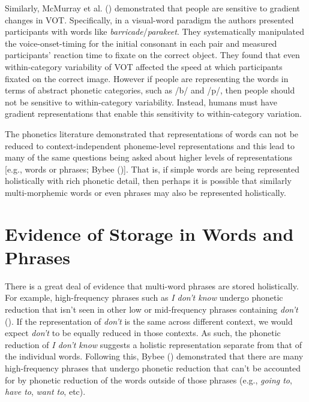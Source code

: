 \documentclass[
  12pt,
  letterpaper,
]{scrreprt}
\begin{document}
Similarly, McMurray et al.
() demonstrated
that people are sensitive to gradient changes in VOT. Specifically, in a
visual-word paradigm the authors presented participants with words like
\emph{barricade}/\emph{parakeet}. They systematically manipulated the
voice-onset-timing for the initial consonant in each pair and measured
participants' reaction time to fixate on the correct object. They found
that even within-category variability of VOT affected the speed at which
participants fixated on the correct image. However if people are
representing the words in terms of abstract phonetic categories, such as
/b/ and /p/, then people should not be sensitive to within-category
variability. Instead, humans must have gradient representations that
enable this sensitivity to within-category variation.

The phonetics literature demonstrated that representations of words can
not be reduced to context-independent phoneme-level representations and
this lead to many of the same questions being asked about higher levels
of representations {[}e.g., words or phrases; Bybee
(){]}. That is, if simple words are being
represented holistically with rich phonetic detail, then perhaps it is
possible that similarly multi-morphemic words or even phrases may also
be represented holistically.

\section{Evidence of Storage in Words and
Phrases}\label{sec-evidence-of-storage-in-words-and-phrases}

There is a great deal of evidence that multi-word phrases are stored
holistically. For example, high-frequency phrases such as \emph{I don't
know} undergo phonetic reduction that isn't seen in other low or
mid-frequency phrases containing \emph{don't}
().
If the representation of \emph{don't} is the same across different
context, we would expect \emph{don't} to be equally reduced in those
contexts. As such, the phonetic reduction of \emph{I don't know}
suggests a holistic representation separate from that of the individual
words. Following this, Bybee ()
demonstrated that there are many high-frequency phrases that undergo
phonetic reduction that can't be accounted for by phonetic reduction of
the words outside of those phrases (e.g., \emph{going to}, \emph{have
to}, \emph{want to}, etc).
\end{document}
